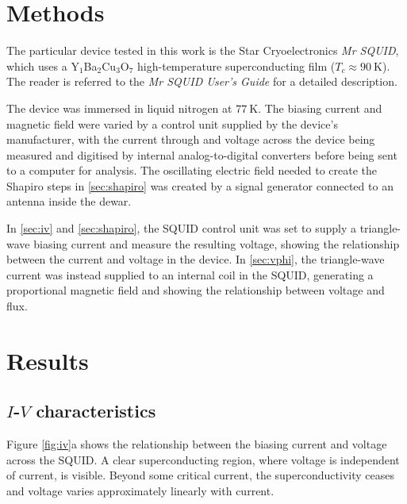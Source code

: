 \documentclass[twocol]{ametsocV6.1}
\begin{document}
\section{Methods} \label{sec:methods}
The particular device tested in this work is the Star Cryoelectronics
\emph{Mr SQUID}, which uses a Y$_1$Ba$_2$Cu$_3$O$_7$ high-temperature
superconducting film ($T_c \approx \SI{90}{\kelvin}$). The reader is referred
to the \emph{Mr SQUID User's Guide} \citep{squid_guide} for a detailed
description.

The device was immersed in liquid nitrogen at $\SI{77}{\kelvin}$. The biasing
current and magnetic field were varied by a control unit supplied by
the device's manufacturer, with the current through and voltage across the
device being measured and digitised by internal analog-to-digital converters
before being sent to a computer for analysis. The oscillating electric
field needed to create the Shapiro steps in \autoref{sec:shapiro} was created
by a signal generator connected to an antenna inside the dewar.

In \autoref{sec:iv} and \autoref{sec:shapiro}, the SQUID control unit was set
to supply a triangle-wave biasing current and measure the resulting voltage,
showing the relationship between the current
and voltage in the device. In \autoref{sec:vphi}, the triangle-wave
current was instead supplied to an internal coil in the SQUID, generating a
proportional magnetic field and showing the relationship between voltage and
flux.

\section{Results} \label{sec:results}
\subsection{$I$-$V$ characteristics} \label{sec:iv}
Figure \ref{fig:iv}a shows the relationship between the biasing current and voltage across the SQUID. A clear
superconducting region, where voltage is independent of current,
is visible. Beyond some critical current, the superconductivity ceases and
voltage varies approximately linearly with current.
\end{document}
